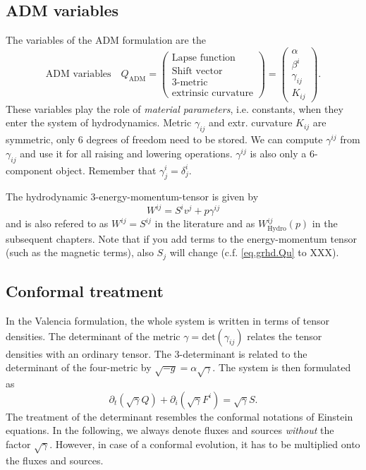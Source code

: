 \documentclass[a4paper]{article}
\newcommand{\desc}[1]{\text{#1}\quad}
\newcommand{\hydro}{\text{Hydro}}
\newcommand{\adm}{\text{ADM}}
\begin{document}
\subsection{ADM variables}
The variables of the ADM formulation are the
\begin{equation}
\desc{ADM variables}
Q_\adm =
\begin{pmatrix}
\text{Lapse function} \\
\text{Shift vector} \\
\text{3-metric} \\
\text{extrinsic curvature}
\end{pmatrix}
=
\begin{pmatrix}
\alpha \\ \beta^i \\ \gamma_{ij} \\ K_{ij}
\end{pmatrix}.
\end{equation}
These variables play the role of \emph{material parameters}, i.e.
constants, when they enter the system of hydrodynamics.
Metric $\gamma_{ij}$ and extr. curvature $K_{ij}$ are symmetric,
only 6 degrees of freedom need to be stored. We can compute
$\gamma^{ij}$ from $\gamma_{ij}$ and use it for all raising and lowering
operations. $\gamma^{ij}$ is also only a 6-component object.
Remember that $\gamma^i_j=\delta^i_j$.

The hydrodynamic 3-energy-momentum-tensor is given by
\begin{equation}\label{eq.grhd.emtensor}
W^{ij} = S^i v^j + p \gamma^{ij}
\end{equation}
and is also refered to as $W^{ij}=S^{ij}$ in the literature and as
$W_\hydro^{ij}(p)$ in the subsequent chapters. Note that if you add terms
to the energy-momentum tensor (such as the magnetic terms), also $S_j$
will change (c.f. \eqref{eq.grhd.Qu} to XXX).

\subsection{Conformal treatment}
In the Valencia formulation, the whole system is written in terms
of tensor densities. The determinant of the metric
$\gamma=\text{det}(\gamma_{ij})$ relates the tensor densities with
an ordinary tensor. The 3-determinant is related to the determinant of
the four-metric by $\sqrt{-g}=\alpha\sqrt{\gamma}$. The system is
then formulated as
\begin{equation}
\partial_t (\sqrt{\gamma} Q)
+ \partial_i (\sqrt{\gamma} F^i) = \sqrt{\gamma} S.
\end{equation}
The treatment of the determinant resembles the conformal notations of
Einstein equations. In the following, we always denote fluxes and
sources \emph{without} the factor $\sqrt{\gamma}$. However, in case of
a conformal evolution, it has to be multiplied onto the fluxes and
sources.
\end{document}
